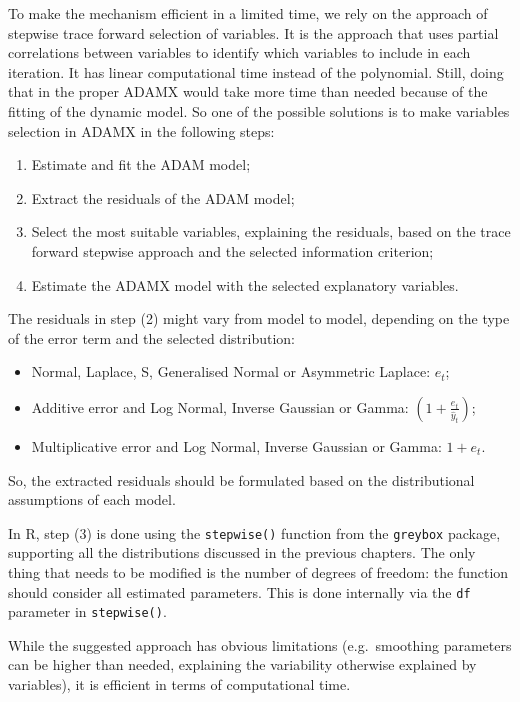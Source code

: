 \documentclass[
]{book}
\providecommand{\tightlist}{%
  \setlength{\itemsep}{0pt}\setlength{\parskip}{0pt}}
\theoremstyle{definition}
\theoremstyle{definition}
\theoremstyle{definition}
\theoremstyle{definition}
\theoremstyle{remark}
\begin{document}
To make the mechanism efficient in a limited time, we rely on the \citet{Sagaert2021} approach of stepwise trace forward selection of variables. It is the approach that uses partial correlations between variables to identify which variables to include in each iteration. It has linear computational time instead of the polynomial. Still, doing that in the proper ADAMX would take more time than needed because of the fitting of the dynamic model. So one of the possible solutions is to make variables selection in ADAMX in the following steps:

\begin{enumerate}
\def\labelenumi{\arabic{enumi}.}
\tightlist
\item
  Estimate and fit the ADAM model;
\item
  Extract the residuals of the ADAM model;
\item
  Select the most suitable variables, explaining the residuals, based on the trace forward stepwise approach and the selected information criterion;
\item
  Estimate the ADAMX model with the selected explanatory variables.
\end{enumerate}

The residuals in step (2) might vary from model to model, depending on the type of the error term and the selected distribution:

\begin{itemize}
\tightlist
\item
  Normal, Laplace, S, Generalised Normal or Asymmetric Laplace: \(e_t\);
\item
  Additive error and Log Normal, Inverse Gaussian or Gamma: \(\left(1+\frac{e_t}{\hat{y}_t} \right)\);
\item
  Multiplicative error and Log Normal, Inverse Gaussian or Gamma: \(1+e_t\).
\end{itemize}

So, the extracted residuals should be formulated based on the distributional assumptions of each model.

In R, step (3) is done using the \texttt{stepwise()} function from the \texttt{greybox} package, supporting all the distributions discussed in the previous chapters. The only thing that needs to be modified is the number of degrees of freedom: the function should consider all estimated parameters. This is done internally via the \texttt{df} parameter in \texttt{stepwise()}.

While the suggested approach has obvious limitations (e.g.~smoothing parameters can be higher than needed, explaining the variability otherwise explained by variables), it is efficient in terms of computational time.
\end{document}
